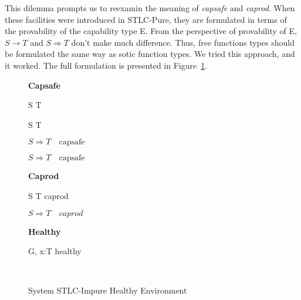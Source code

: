 This dilemma prompts us to reexamin the meaning of \emph{capsafe} and
\emph{caprod}. When these facilities were introduced in STLC-Pure,
they are formulated in terms of the provability of the capability type
E. From the perspective of provability of E, $S \to T$ and
$S \Rightarrow T$ don't make much difference. Thus, free functions
types should be formulated the same way as sotic function types. We
tried this approach, and it worked. The full formulation is presented
in Figure~\ref{fig:stlc-impure-healthy-definition}.

\begin{figure}[h]
\begin{framed}

\setlength{\columnseprule}{0.4pt}
\begin{multicols}{2}

\textbf{Capsafe}


{ S \to T \quad {} }

{ S \to T \quad {} }

{ \colorbox{shade}{$S \Rightarrow T \quad \text{capsafe}$} }

{ \colorbox{shade}{$S \Rightarrow T \quad \text{capsafe}$} }

\columnbreak

\textbf{Caprod}


{ S \to T \quad caprod }

{ \colorbox{shade}{$S \Rightarrow T \quad caprod$} }

\textbf{Healthy}


{ G, \; x:T \quad healthy }

\hfill\\

\end{multicols}
\end{framed}

\caption{System STLC-Impure Healthy Environment}
\label{fig:stlc-impure-healthy-definition}
\end{figure}

